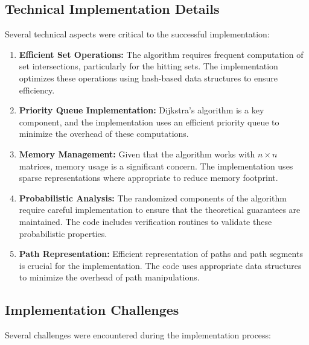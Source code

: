 \documentclass[a4paper,11pt,oneside]{book}
\begin{document}
\subsection{Technical Implementation Details}

Several technical aspects were critical to the successful implementation:\\

\begin{enumerate}
    \item \textbf{Efficient Set Operations:} The algorithm requires frequent computation of set intersections, particularly for the hitting sets. The implementation optimizes these operations using hash-based data structures to ensure efficiency.
    
    \item \textbf{Priority Queue Implementation:} Dijkstra's algorithm is a key component, and the implementation uses an efficient priority queue to minimize the overhead of these computations.
    
    \item \textbf{Memory Management:} Given that the algorithm works with $n \times n$ matrices, memory usage is a significant concern. The implementation uses sparse representations where appropriate to reduce memory footprint.
    
    \item \textbf{Probabilistic Analysis:} The randomized components of the algorithm require careful implementation to ensure that the theoretical guarantees are maintained. The code includes verification routines to validate these probabilistic properties.
    
    \item \textbf{Path Representation:} Efficient representation of paths and path segments is crucial for the implementation. The code uses appropriate data structures to minimize the overhead of path manipulations.
\end{enumerate}

\subsection{Implementation Challenges}

Several challenges were encountered during the implementation process:\\
\end{document}
